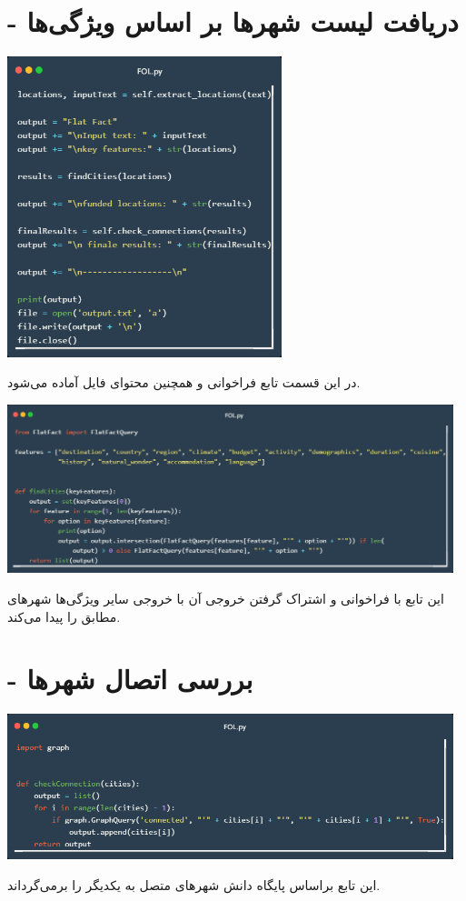\documentclass[12pt, dvipsnames, svgnames, x11names,]{article}
\begin{document}
	\section{ - دریافت لیست شهرها بر اساس ویژگی‌ها}
		\begin{center}
			\includegraphics[width=8cm]{images/06}
		\end{center}
		{\normalsize در این قسمت تابع  فراخوانی و همچنین محتوای فایل  آماده می‌شود.} \par
		\begin{center}
			\includegraphics[width=13cm]{images/07}
		\end{center}
		{\normalsize این تابع با فراخوانی  و اشتراک گرفتن خروجی آن با خروجی سایر ویژگی‌ها شهرهای مطابق را پیدا می‌‌کند.}
	
	\section{ - بررسی اتصال شهرها}
				\begin{center}
			\includegraphics[width=13cm]{images/08}
		\end{center}
		{\normalsize این تابع براساس پایگاه دانش شهرهای متصل به یکدیگر را برمی‌گرداند.}
	
\end{document}
